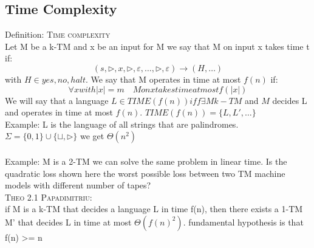 \subsection*{Time Complexity}
Definition: \textsc{Time complexity}\\
Let M be a k-TM and x be an input for M we say that M on input x takes time t if: \[ 
    (s, \triangleright, x, \triangleright, \varepsilon, \ldots, \triangleright, \varepsilon) \longrightarrow ( H,\ldots) 
\] with $ H \in {yes, no, halt} $. We say that M operates in time at most $ f(n) $ if: \[ 
    \forall x with |x| = m \quad M on x takes time at most f(|x|) 
\]
We will say that a language $ L \in TIME(f(n)) iff \exists M k-TM$ and $M$ decides L and operates in time at most $f(n)$. $TIME(f(n)) = \{L, L', \ldots\} $\\
Example: L is the language of all strings that are palindromes. $ \Sigma = \{0,1\}\cup\{\sqcup, \triangleright\} $ we get $ \Theta(n^2) $\\\\
Example: M is a 2-TM we can solve the same problem in linear time. Is the quadratic loss shown here the worst possible loss between two TM machine models with different number of tapes?\\
\textsc{Theo 2.1 Papadimitriu}:\\
if M is a k-TM that decides a language L in time f(n), then there exists a 1-TM M' that decides L in time at most $ \Theta(f(n)^2) $. fundamental hypothesis is that f(n) >= n
\\